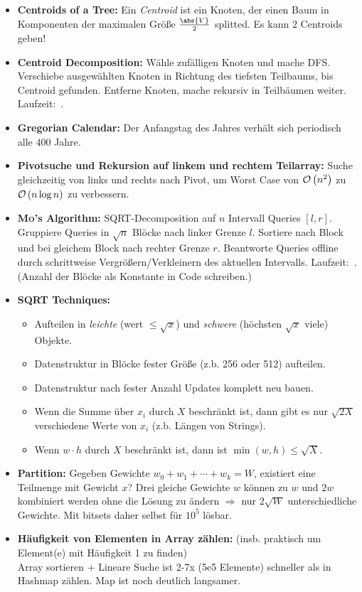\begin{itemize}
	\item \textbf{Centroids of a Tree:}
	Ein \emph{Centroid} ist ein Knoten, der einen Baum in Komponenten der maximalen Größe $\frac{\abs{V}}{2}$ splitted.
	Es kann $2$ Centroids geben!
	
	\item \textbf{Centroid Decomposition:}
	Wähle zufälligen Knoten und mache DFS.
	Verschiebe ausgewählten Knoten in Richtung des tiefsten Teilbaums, bis Centroid gefunden. Entferne Knoten, mache rekursiv in Teilbäumen weiter. Laufzeit:~.
	\item \textbf{Gregorian Calendar:} Der Anfangstag des Jahres verhält sich periodisch alle $400$ Jahre.

	\item \textbf{Pivotsuche und Rekursion auf linkem und rechtem Teilarray:}
	Suche gleichzeitig von links und rechts nach Pivot, um Worst Case von
	$\mathcal{O}\left(n^2\right)$ zu $\mathcal{O}\left(n\log n\right)$ zu verbessern.
	
	\item \textbf{\textsc{Mo}'s Algorithm:}
	SQRT-Decomposition auf $n$ Intervall Queries $[l,r]$.
	Gruppiere Queries in $\sqrt{n}$ Blöcke nach linker Grenze $l$.
	Sortiere nach Block und bei gleichem Block nach rechter Grenze $r$.
	Beantworte Queries offline durch schrittweise Vergrößern/Verkleinern des aktuellen Intervalls.
	Laufzeit:~.
	(Anzahl der Blöcke als Konstante in Code schreiben.)
	
	\item \textbf{SQRT Techniques:}
	\begin{itemize}
		\item Aufteilen in \emph{leichte} (wert $\leq\sqrt{x}$) und \emph{schwere} (höchsten $\sqrt{x}$ viele) Objekte.
		\item Datenstruktur in Blöcke fester Größe (z.b. 256 oder 512) aufteilen.
		\item Datenstruktur nach fester Anzahl Updates komplett neu bauen.
		\item Wenn die Summe über $x_i$ durch $X$ beschränkt ist, dann gibt es nur $\sqrt{2X}$ verschiedene Werte von $x_i$ (z.b. Längen von Strings).
		\item Wenn $w\cdot h$ durch $X$ beschränkt ist, dann ist $\min(w,h)\leq\sqrt{X}$.
	\end{itemize}

	\item \textbf{Partition:}
	Gegeben Gewichte $w_0+w_1+\cdots+w_k=W$, existiert eine Teilmenge mit Gewicht $x$?
	Drei gleiche Gewichte $w$ können zu $w$ und $2w$ kombiniert werden ohne die Lösung zu ändern $\Rightarrow$ nur $2\sqrt{W}$ unterschiedliche Gewichte.
	Mit bitsets daher selbst für $10^5$ lösbar.

	\item \textbf{Häufigkeit von Elementen in Array zählen:}
	(insb. praktisch um Element(e) mit Häufigkeit 1 zu finden) \\
	Array sortieren + Lineare Suche ist 2-7x (5e5 Elemente) schneller als in Hashmap zählen.
	Map ist noch deutlich langsamer.
\end{itemize}


